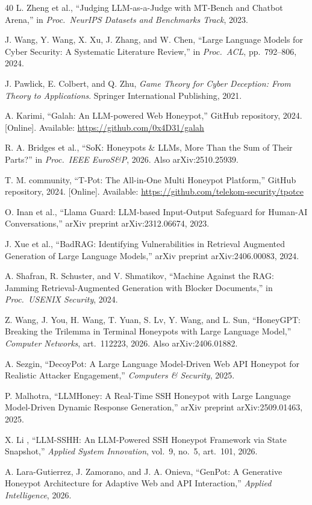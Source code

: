 \begin{thebibliography}{40}
 L. Zheng et al., ``Judging LLM-as-a-Judge with MT-Bench and Chatbot Arena,'' in \emph{Proc.\ NeurIPS Datasets and Benchmarks Track}, 2023.

 J. Wang, Y. Wang, X. Xu, J. Zhang, and W. Chen, ``Large Language Models for Cyber Security: A Systematic Literature Review,'' in \emph{Proc.\ ACL}, pp.~792--806, 2024.

 J. Pawlick, E. Colbert, and Q. Zhu, \emph{Game Theory for Cyber Deception: From Theory to Applications}. Springer International Publishing, 2021.

 A. Karimi, ``Galah: An LLM-powered Web Honeypot,'' GitHub repository, 2024. [Online]. Available: \url{https://github.com/0x4D31/galah}

 R. A. Bridges et al., ``SoK: Honeypots \& LLMs, More Than the Sum of Their Parts?'' in \emph{Proc.\ IEEE EuroS\&P}, 2026. Also arXiv:2510.25939.

 T. M. community, ``T-Pot: The All-in-One Multi Honeypot Platform,'' GitHub repository, 2024. [Online]. Available: \url{https://github.com/telekom-security/tpotce}

 O. Inan et al., ``Llama Guard: LLM-based Input-Output Safeguard for Human-AI Conversations,'' arXiv preprint arXiv:2312.06674, 2023.

 J. Xue et al., ``BadRAG: Identifying Vulnerabilities in Retrieval Augmented Generation of Large Language Models,'' arXiv preprint arXiv:2406.00083, 2024.

 A. Shafran, R. Schuster, and V. Shmatikov, ``Machine Against the RAG: Jamming Retrieval-Augmented Generation with Blocker Documents,'' in \emph{Proc.\ USENIX Security}, 2024.

 Z. Wang, J. You, H. Wang, T. Yuan, S. Lv, Y. Wang, and L. Sun, ``HoneyGPT: Breaking the Trilemma in Terminal Honeypots with Large Language Model,'' \emph{Computer Networks}, art.~112223, 2026. Also arXiv:2406.01882.

 A. Sezgin, ``DecoyPot: A Large Language Model-Driven Web API Honeypot for Realistic Attacker Engagement,'' \emph{Computers \& Security}, 2025.

 P. Malhotra, ``LLMHoney: A Real-Time SSH Honeypot with Large Language Model-Driven Dynamic Response Generation,'' arXiv preprint arXiv:2509.01463, 2025.

 X. Li \etal, ``LLM-SSHH: An LLM-Powered SSH Honeypot Framework via State Snapshot,'' \emph{Applied System Innovation}, vol.~9, no.~5, art.~101, 2026.

 A. Lara-Gutierrez, J. Zamorano, and J. A. Onieva, ``GenPot: A Generative Honeypot Architecture for Adaptive Web and API Interaction,'' \emph{Applied Intelligence}, 2026.

\end{thebibliography}
